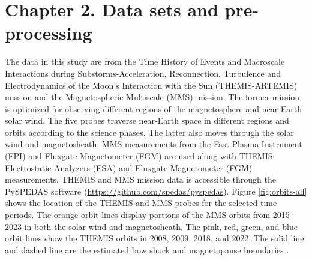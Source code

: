 \chapter{Chapter 2. Data sets and pre-processing}

The data in this study are from the Time History of Events and Macroscale Interactions during Substorms-Acceleration, Reconnection, Turbulence and Electrodynamics of the Moon’s Interaction with the Sun (THEMIS-ARTEMIS) mission  and the Magnetospheric Multiscale (MMS) mission. The former mission is optimized for observing different regions of the magnetosphere and near-Earth solar wind. The five probes traverse near-Earth space in different regions and orbits according to the science phases. The latter also moves through the solar wind and magnetosheath. MMS measurements from the Fast Plasma Instrument (FPI) and Fluxgate Magnetometer (FGM) are used along with THEMIS Electrostatic Analyzers (ESA) and Fluxgate Magnetometer (FGM) measurements. THEMIS and MMS mission data is accessible through the PySPEDAS software (\url{https://github.com/spedas/pyspedas}). Figure \ref{fig:orbits-all} shows the location of the THEMIS and MMS probes for the selected time periods. The orange orbit lines display portions of the MMS orbits from 2015-2023 in both the solar wind and magnetosheath. The pink, red, green, and blue orbit lines show the THEMIS orbits in 2008, 2009, 2018, and 2022. The solid line and dashed line are the estimated bow shock and magnetopause boundaries \cite{SlavinHolzer:1984,Shue:1997}. %

